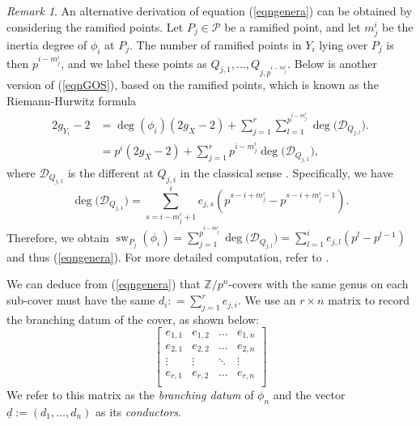 \documentclass{compositio}
\theoremstyle{remark}
\theoremstyle{remark}
\newtheorem{remark}[theorem]{Remark}
\DeclareMathOperator{\sw}{sw}
\begin{document}
\begin{remark}
\label{remarkgosramified}
    An alternative derivation of equation (\ref{eqngenera}) can be obtained by considering the ramified points. Let $P_j \in \mathscr{P}$ be a ramified point, and let $m^i_j$ be the inertia degree of $\phi_i$ at $P_j$. The number of ramified points in $Y_i$ lying over $P_j$ is then $p^{i-m^i_j}$, and we label these points as $Q_{j,1}, \ldots, Q_{j,p^{i-m^i_j}}$. Below is another version of (\ref{eqnGOS}), based on the ramified points, which is known as the Riemann-Hurwitz formula \cite{MR0463157}
    \begin{equation}
    \label{eqnRH}
    \begin{split}
        2g_{Y_i}-2 & =\deg(\phi_i) (2g_X-2) + \sum_{j=1}^r \sum_{l=1}^{p^{i-m^i_j}} \deg\big(\mathscr{D}_{Q_{j,l}}\big). \\
        & =p^i (2g_X-2) + \sum_{j=1}^r p^{i-m^i_j} \deg\big(\mathscr{D}_{Q_{j,1}}\big),
    \end{split}
    \end{equation}
    where $\mathscr{D}_{Q_{j,1}}$ is the different at $Q_{j,i}$ in the classical sense \cite[III, \S 3]{MR554237}. Specifically, we have
    \begin{equation*}
        \deg\big(\mathscr{D}_{Q_{j,1}}\big)= \sum_{s=i-m^i_j+1}^i e_{j,s}(p^{s-i+m^i_j}-p^{s-i+m^i_j-1}).
    \end{equation*}
    Therefore, we obtain $\sw_{P_j}(\phi_i)=\sum_{j=1}^{p^{i-m^i_j}} \deg\big(\mathscr{D}_{Q_{j,l}}\big)=\sum_{l=1}^i e_{j,l}(p^l-p^{l-1})$ and thus (\ref{eqngenera}). For more detailed computation, refer to \cite[\S 2.A.]{MR3194816}.
\end{remark}

We can deduce from (\ref{eqngenera}) that $\mathbb{Z}/p^n$-covers with the same genus on each sub-cover must have the same $d_i: = \sum_{j=1}^r e_{j,i}$. We use an $r \times n$ matrix to record the branching datum of the cover, as shown below:
\begin{equation}
\label{eqnmatrixbranchingdatum}    
\begin{bmatrix}
e_{1,1} & e_{1,2} & \ldots & e_{1,n} \\
e_{2,1} & e_{2,2} & \ldots & e_{2,n} \\
\vdots  & \vdots  & \ddots & \vdots  \\
e_{r,1} & e_{r,2} & \ldots & e_{r,n} \\
\end{bmatrix}
\end{equation}
We refer to this matrix as the \textit{branching datum} of $\phi_n$ and the vector $\underline{d}:= (d_1, \ldots, d_n)$ as its \textit{conductors}. 
\end{document}
